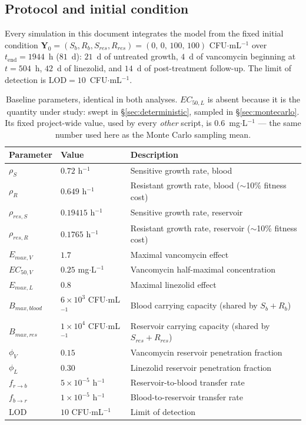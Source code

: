 \documentclass[11pt]{article}
\begin{document}
\subsection{Protocol and initial condition}

Every simulation in this document integrates the model from the fixed
initial condition
$\mathbf{Y}_0 = (S_b, R_b, S_{res}, R_{res}) = (0,\,0,\,100,\,100)$
CFU$\cdot$mL$^{-1}$ over $t_{\mathrm{end}} = 1944$~h ($81$~d): $21$~d of
untreated growth, $4$~d of vancomycin beginning at $t = 504$~h, $42$~d of
linezolid, and $14$~d of post-treatment follow-up. The limit of detection
is $\mathrm{LOD} = 10$~CFU$\cdot$mL$^{-1}$.

\begin{table}[htbp]
\centering
\begin{tabular}{@{}lll@{}}
\toprule
Parameter & Value & Description \\
\midrule
$\rho_S$              & $0.72$ h$^{-1}$          & Sensitive growth rate, blood \\
$\rho_R$              & $0.649$ h$^{-1}$         & Resistant growth rate, blood ($\sim$10\% fitness cost) \\
$\rho_{res,S}$        & $0.19415$ h$^{-1}$       & Sensitive growth rate, reservoir \\
$\rho_{res,R}$        & $0.1765$ h$^{-1}$        & Resistant growth rate, reservoir ($\sim$10\% fitness cost) \\
$E_{max,V}$           & $1.7$                    & Maximal vancomycin effect \\
$EC_{50,V}$           & $0.25$ mg$\cdot$L$^{-1}$ & Vancomycin half-maximal concentration \\
$E_{max,L}$           & $0.8$                    & Maximal linezolid effect \\
$B_{max,blood}$       & $6\times10^{3}$ CFU$\cdot$mL$^{-1}$ & Blood carrying capacity (shared by $S_b + R_b$) \\
$B_{max,res}$         & $1\times10^{4}$ CFU$\cdot$mL$^{-1}$ & Reservoir carrying capacity (shared by $S_{res} + R_{res}$) \\
$\phi_V$              & $0.15$                   & Vancomycin reservoir penetration fraction \\
$\phi_L$              & $0.30$                   & Linezolid reservoir penetration fraction \\
$f_{r\to b}$          & $5\times10^{-5}$ h$^{-1}$ & Reservoir-to-blood transfer rate \\
$f_{b\to r}$          & $1\times10^{-5}$ h$^{-1}$ & Blood-to-reservoir transfer rate \\
$\mathrm{LOD}$        & $10$ CFU$\cdot$mL$^{-1}$  & Limit of detection \\
\bottomrule
\end{tabular}
\caption{Baseline parameters, identical in both analyses. $EC_{50,L}$ is
absent because it is the quantity under study: swept in
\S\ref{sec:deterministic}, sampled in \S\ref{sec:montecarlo}. Its fixed
project-wide value, used by every \emph{other} script, is
$0.6$~mg$\cdot$L$^{-1}$ --- the same number used here as the Monte Carlo
sampling mean.}
\label{tab:base}
\end{table}
\end{document}
